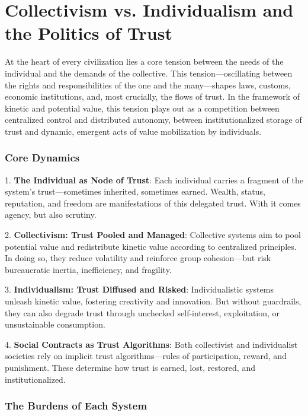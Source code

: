 \documentclass[11pt,oneside]{book}
\begin{document}
\section{Collectivism vs. Individualism and the Politics of Trust}

At the heart of every civilization lies a core tension between the needs of the individual and the demands of the collective. This tension—oscillating between the rights and responsibilities of the one and the many—shapes laws, customs, economic institutions, and, most crucially, the flows of trust. In the framework of kinetic and potential value, this tension plays out as a competition between centralized control and distributed autonomy, between institutionalized storage of trust and dynamic, emergent acts of value mobilization by individuals.

\subsubsection{Core Dynamics}


1. \textbf{The Individual as Node of Trust}: Each individual carries a fragment of the system's trust—sometimes inherited, sometimes earned. Wealth, status, reputation, and freedom are manifestations of this delegated trust. With it comes agency, but also scrutiny.



2. \textbf{Collectivism: Trust Pooled and Managed}: Collective systems aim to pool potential value and redistribute kinetic value according to centralized principles. In doing so, they reduce volatility and reinforce group cohesion—but risk bureaucratic inertia, inefficiency, and fragility.



3. \textbf{Individualism: Trust Diffused and Risked}: Individualistic systems unleash kinetic value, fostering creativity and innovation. But without guardrails, they can also degrade trust through unchecked self-interest, exploitation, or unsustainable consumption.



4. \textbf{Social Contracts as Trust Algorithms}: Both collectivist and individualist societies rely on implicit trust algorithms—rules of participation, reward, and punishment. These determine how trust is earned, lost, restored, and institutionalized.


\subsubsection{The Burdens of Each System}
\end{document}
